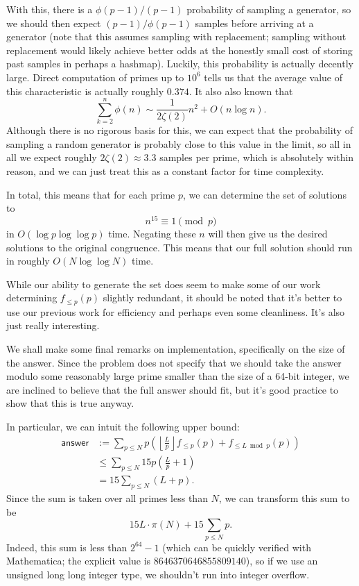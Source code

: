 \documentclass[a4paper, 12pt]{article}
\begin{document}
\begin{solution}
    With this, there is a \( \phi(p-1) / (p - 1) \) probability of sampling a generator, so we should then expect \( (p - 1) / \phi(p - 1) \) samples before arriving at a generator (note that this assumes sampling with replacement; sampling without replacement would likely achieve better odds at the honestly small cost of storing past samples in perhaps a hashmap). Luckily, this probability is actually decently large. Direct computation of primes up to \( 10^6 \) tells us that the average value of this characteristic is actually roughly \( 0.374 \). It also also known that
    \[
        \sum_{k = 2}^{n} \phi(n) \sim \frac{1}{2 \zeta(2)} n^2 + O(n \log n)
    .\]
    Although there is no rigorous basis for this, we can expect that the probability of sampling a random generator is probably close to this value in the limit, so all in all we expect roughly \( 2 \zeta(2) \approx 3.3 \) samples per prime, which is absolutely within reason, and we can just treat this as a constant factor for time complexity.

    In total, this means that for each prime \( p \), we can determine the set of solutions to
    \[
        n^{15} \equiv 1 \pmod{p}
    \]
    in \( O (\log{p} \log{\log p}) \) time. Negating these \( n \) will then give us the desired solutions to the original congruence. This means that our full solution should run in roughly \( O(N \log{\log N}) \) time.

    While our ability to generate the set does seem to make some of our work determining \( f_{\le p}(p) \) slightly redundant, it should be noted that it's better to use our previous work for efficiency and perhaps even some cleanliness. It's also just really interesting.

    \begin{remark}
        We shall make some final remarks on implementation, specifically on the size of the answer. Since the problem does not specify that we should take the answer modulo some reasonably large prime smaller than the size of a 64-bit integer, we are inclined to believe that the full answer should fit, but it's good practice to show that this is true anyway.

        In particular, we can intuit the following upper bound:
        \begin{align*}
            \textsf{answer} &:= \sum_{p \le N} p \left( \left\lfloor \frac{L}{p} \right\rfloor f_{\le p} (p)  + f_{\le L \bmod p} (p) \right) \\
            &\le \sum_{p \le N} 15 p \left( \frac{L}{p} + 1 \right) \\
            &= 15 \sum_{p \le N} \left( L + p \right)
        .\end{align*}
        Since the sum is taken over all primes less than \( N \), we can transform this sum to be
        \[
            15L \cdot \pi (N) + 15 \sum_{p \le N} p
        .\]
        Indeed, this sum is less than \( 2^{64} - 1 \) (which can be quickly verified with Mathematica; the explicit value is \( 8646370646855809140 \)), so if we use an unsigned long long integer type, we shouldn't run into integer overflow.
    \end{remark}
\end{solution}
\end{document}
